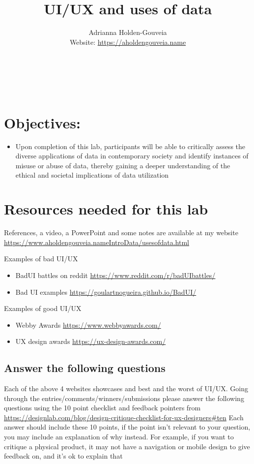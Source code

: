 \documentclass[12pt]{article}
\title{UI/UX and uses of data}
\author{
        Adrianna Holden-Gouveia \\
        Website: \url{https://aholdengouveia.name}\\ 
        \date{\vspace{-5ex}}
        \faLinkedin{: aholdengouveia} \\
        \faGithub {: aholdengouveia} \\
        \faTwitter {: aholdengouveia} \\
        }
\begin{document}
    

\maketitle


\section*{Objectives:}
\begin{itemize}
    \item Upon completion of this lab, participants will be able to critically assess the diverse applications of data in contemporary society and identify instances of misuse or abuse of data, thereby gaining a deeper understanding of the ethical and societal implications of data utilization
\end{itemize}


\section*{Resources needed for this lab}

References, a video, a PowerPoint and some notes are available at my website
\url {https://www.aholdengouveia.nameIntroData/usesofdata.html}

Examples of bad UI/UX
\begin{itemize}
    \item BadUI battles on reddit \url{https://www.reddit.com/r/badUIbattles/}
    \item Bad UI examples \url{https://goulartnogueira.github.io/BadUI/}
\end{itemize}    

Examples of good UI/UX
\begin{itemize}
    \item Webby Awards \url{https://www.webbyawards.com/}
    \item UX design awards \url{https://ux-design-awards.com/}
\end{itemize}


\subsection*{Answer the following questions}
Each of the above 4 websites showcases and best and the worst of UI/UX. Going through the entries/comments/winners/submissions please answer the following questions using the 10 point checklist and feedback pointers from \url{https://designlab.com/blog/design-critique-checklist-for-ux-designers#ten} Each answer should include these 10 points, if the point isn't relevant to your question, you may include an explanation of why instead. For example, if you want to critique a physical product, it may not have a navigation or mobile design to give feedback on, and it's ok to explain that
\end{document}
